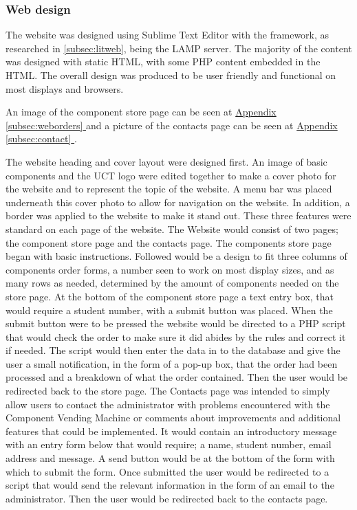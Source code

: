 \documentclass[a4paper,11pt]{article}
\newcommand*{\fullref}[1]{\hyperref[{#1}]{\Appendixautorefname  \ref*{#1} \nameref*{#1}}}
\newcommand*{\Appendixautorefname}{Appendix }
\numberwithin{figure}{section}
\numberwithin{table}{section}
\begin{document}
\subsubsection{Web design}
\label{subsubsec:webdev}

The website was designed using Sublime Text Editor with the framework, as researched in \autoref{subsec:litweb}, being the LAMP server. The majority of the content was designed with static HTML, with some PHP content embedded in the HTML. The overall design was produced to be user friendly and functional on most displays and browsers.

An image of the component store page can be seen at \fullref{subsec:weborders} and a picture of the contacts page can be seen at \fullref{subsec:contact}.

The website heading and cover layout were designed first. An image of basic components and the UCT logo were edited together to make a cover photo for the website and to represent the topic of the website. A menu bar was placed underneath this cover photo to allow for navigation on the website. In addition, a border was applied to the website to make it stand out. These three features were standard on each page of the website. The Website would consist of two pages; the component store page and the contacts page. The components store page began with basic instructions. Followed would be a design to fit three columns of components order forms, a number seen to work on most display sizes, and as many rows as needed, determined by the amount of components needed on the store page. At the bottom of the component store page a text entry box, that would require a student number, with a submit button was placed. When the submit button were to be pressed the website would be directed to a PHP script that would check the order to make sure it did abides by the rules and correct it if needed. The script would then enter the data in to the database and give the user a small notification, in the form of a pop-up box, that the order had been processed and a breakdown of what the order contained. Then the user would be redirected back to the store page. The Contacts page was intended to simply allow users to contact the administrator with problems encountered with the Component Vending Machine or comments about improvements and additional features that could be implemented. It would contain an introductory message with an entry form below that would require; a name, student number, email address and message. A send button would be at the bottom of the form with which to submit the form. Once submitted the user would be redirected to a script that would send the relevant information in the form of an email to the administrator. Then the user would be redirected back to the contacts page.
\end{document}
